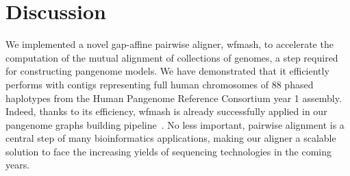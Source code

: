 \documentclass{bioinfo}
\theoremstyle{definition}
\begin{document}
\begin{comment}
\begin{table}[!t]
    \processtable{
        \small
        Performance of pairwise alignment of long sequences from the \textit{Saccharomyces cerevisiae}
        chromosome IV.
        \label{Tab:01}} {
        \begin{tabular}{@{}llllllll@{}}
            \toprule Aligner & Divergence & Length & Runtime (mm:ss) & Memory (GB) & Precision & Sensitivity & F-measure \\
            \midrule
            row1             & row1       & row1   & row1            & row1        & row1      & row1        & row1      \\
            row2             & row2       & row2   & row2            & row1        & row1      & row1        & row1      \\
            row3             & row3       & row3   & row3            & row1        & row1      & row1        & row1      \\
            row4             & row4       & row4   & row4            & row1        & row1      & row1        & row1      \\
            \botrule
        \end{tabular}
    }
\end{table}


\subsection{Real data}
\\


\end{comment}


\section{Discussion}
\label{sec:discussion}

We implemented a novel gap-affine pairwise aligner, wfmash, to accelerate the computation of the mutual alignment of collections of genomes, a step required for constructing pangenome models.
We have demonstrated that it efficiently performs with contigs representing full human chromosomes of 88 phased haplotypes from the Human Pangenome Reference Consortium year 1 assembly.
Indeed, thanks to its efficiency, wfmash is already successfully applied in our pangenome graphs building pipeline~\citep{pggb-gh}.
No less important, pairwise alignment is a central step of many bioinformatics applications, making our aligner a scalable solution to face the increasing yields of sequencing technologies in the coming years.
\end{document}
